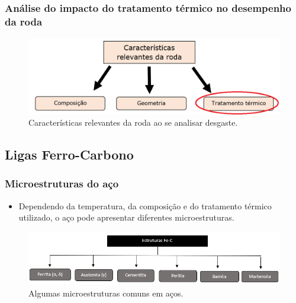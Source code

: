 \documentclass{beamer}
\begin{document}
\begin{frame}

\frametitle{Análise do impacto do tratamento térmico no desempenho da roda}



\begin{figure}
	\centering
	\includegraphics[width=1\textwidth]{caracteristicas_roda_circ}
	\caption{Características relevantes da roda ao se analisar desgaste.}
	\label{fig:caracteristicas_roda_circ}
\end{figure}



\end{frame}


\subsection{Ligas Ferro-Carbono}

\begin{frame}
\frametitle{Microestruturas do aço}
\begin{itemize}
	\item Dependendo da temperatura, da composição e do tratamento térmico utilizado, o aço pode apresentar diferentes microestruturas.
\end{itemize}

\begin{figure}
	\centering
	\includegraphics[width=1\textwidth]{alotropia}
	\caption{Algumas microestruturas comuns em aços.}
	\label{fig:alotropia}
\end{figure}

\end{frame}
\end{document}
